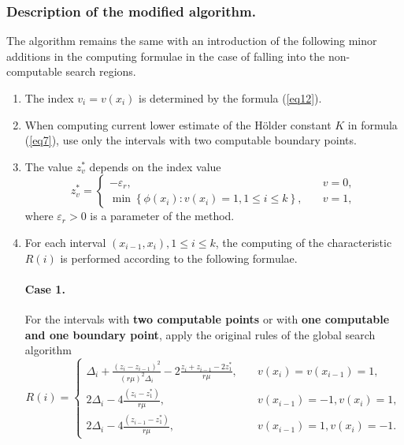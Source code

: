 \documentclass[runningheads]{llncs}
\begin{document}
\subsubsection{Description of the modified algorithm.} The algorithm remains the same with an introduction of the following minor additions in the computing formulae in the case of falling into the non-computable search regions.
\begin{enumerate} 
  \item The index $v_i=v(x_i)$ is determined by the formula (\ref{eq12}).
  \item When computing current lower estimate of the H{\"o}lder constant $K$ in formula (\ref{eq7}), use only the intervals with two computable boundary points.
  \item The value $z_v^*$ depends on the index value
\begin{equation}\label{eq20} 
z_v^*=
  \begin{cases}
    -\varepsilon _r, & {\quad v=0 ,}\\
    \min \left\{ \phi (x_i): v(x_i)=1, 1 \leq i \leq k \right\}, & {\quad v=1 ,}
  \end{cases}
\end{equation}
where $\varepsilon _r > 0$ is a parameter of the method.

  \item For each interval $(x_{i-1}, x_i), 1 \leq i \leq k$, the computing of the characteristic $R(i)$ is performed according to the following formulae.
      
        \paragraph{Case 1.} For the intervals with \textbf{two computable points} or with \textbf{one computable and one boundary point}, apply the original rules of the global search algorithm
\begin{equation}\label{eq21} 
R(i)=
  \begin{cases}
     \Delta _i+\frac {{(z_i-z_{i-1})}^2}{{(r \mu)}^2 \Delta _i} - 2 \frac {z_i+z_{i-1}-2z_1^*}{r \mu}, & {\quad  v(x_i)=v(x_{i-1})=1,}\\
    2 \Delta _i-4 \frac {(z_i-z_1^*)}{r \mu}, & {\quad  v(x_{i-1})=-1, v(x_i)=1,}\\
    2 \Delta _i-4 \frac {(z_{i-1}-z_1^*)}{r \mu}, & {\quad  v(x_{i-1})=1, v(x_i)=-1.}
  \end{cases}
\end{equation}

\end{enumerate}
\end{document}

